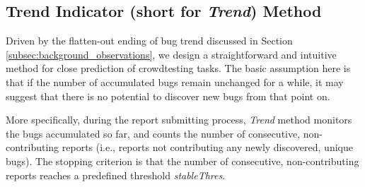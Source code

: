\documentclass[sigconf,review, anonymous]{acmart}
\begin{document}


\subsection{Trend Indicator (short for \textit{Trend}) Method}
\label{subsec:method_Trend}

Driven by the flatten-out ending of bug trend discussed in Section \ref{subsec:background_observations}, we design a straightforward and intuitive method for close prediction of crowdtesting tasks.
The basic assumption here is that if the number of accumulated bugs remain unchanged for a while, it may suggest that there is no potential to discover new bugs from that point on. 

More specifically, during the report submitting process, \textit{Trend} method monitors the bugs accumulated so far, and counts the number of consecutive, non-contributing reports (i.e., reports not contributing any newly discovered, unique bugs).
The stopping criterion is that the number of consecutive, non-contributing reports reaches a predefined threshold \textit{stableThres}.



\end{document}
